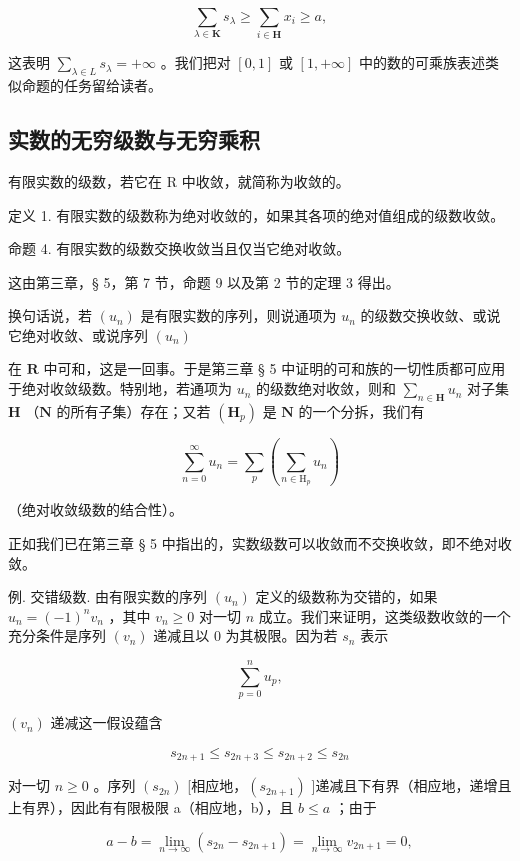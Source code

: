 \[
\sum_ {\lambda \in \mathbf {K}} s _ {\lambda} \geqslant \sum_ {i \in \mathbf {H}} x _ {i} \geqslant a,
\]

这表明 \(\sum_{\lambda \in L} s_{\lambda} = +\infty\) 。我们把对 \([0, 1]\) 或 \([1, +\infty]\) 中的数的可乘族表述类似命题的任务留给读者。

\subsection{实数的无穷级数与无穷乘积}

有限实数的级数，若它在 R 中收敛，就简称为收敛的。

定义 1. 有限实数的级数称为绝对收敛的，如果其各项的绝对值组成的级数收敛。

命题 4. 有限实数的级数交换收敛当且仅当它绝对收敛。

这由第三章，§ 5，第 7 节，命题 9 以及第 2 节的定理 3 得出。

换句话说，若 \((u_{n})\) 是有限实数的序列，则说通项为 \(u_{n}\) 的级数交换收敛、或说它绝对收敛、或说序列 \((u_{n})\)

在 \(\mathbf{R}\) 中可和，这是一回事。于是第三章 § 5 中证明的可和族的一切性质都可应用于绝对收敛级数。特别地，若通项为 \(u_{n}\) 的级数绝对收敛，则和 \(\sum_{n\in\mathbf{H}} u_{n}\) 对子集 \(\mathbf{H}\) （\(\mathbf{N}\) 的所有子集）存在；又若 \((\mathbf{H}_{p})\) 是 \(\mathbf{N}\) 的一个分拆，我们有

\[
\sum_ {n = 0} ^ {\infty} u _ {n} = \sum_ {p} \left(\sum_ {n \in \mathrm{H} _ {p}} u _ {n}\right)
\]

（绝对收敛级数的结合性）。

正如我们已在第三章 § 5 中指出的，实数级数可以收敛而不交换收敛，即不绝对收敛。

例. 交错级数. 由有限实数的序列 \((u_n)\) 定义的级数称为交错的，如果 \(u_n = (-1)^n v_n\) ，其中 \(v_n \geqslant 0\) 对一切 \(n\) 成立。我们来证明，这类级数收敛的一个充分条件是序列 \((v_n)\) 递减且以 \(0\) 为其极限。因为若 \(s_n\) 表示

\[
\sum_ {p = 0} ^ {n} u _ {p},
\]

\((v_{n})\) 递减这一假设蕴含

\[
s _ {2 n + 1} \leqslant s _ {2 n + 3} \leqslant s _ {2 n + 2} \leqslant s _ {2 n}
\]

对一切 \(n \geqslant 0\) 。序列 \((s_{2n})\) {[}相应地，\((s_{2n+1})\) {]}递减且下有界（相应地，递增且上有界），因此有有限极限 a（相应地，b），且 \(b \leqslant a\) ；由于

\[
a - b = \lim _ {n \rightarrow \infty} (s _ {2 n} - s _ {2 n + 1}) = \lim _ {n \rightarrow \infty} v _ {2 n + 1} = 0,
\]

